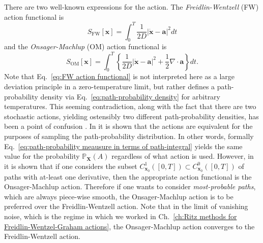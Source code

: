 There are two well-known expressions for the action. The \textit{Freidlin-Wentzell} (FW) action functional is \citep{adibStochasticActionsDiffusive2008, ventselSMALLRANDOMPERTURBATIONS1970, touchetteLargeDeviationApproach2009, grafkeNumericalComputationRare2019}
\begin{equation} \label{eq:FW action functional}
S_\text{FW}[\mathbf{x}] = \int_0^T \frac{1}{2 D} |\dot{\mathbf{x}} - \mathbf{a}|^2 dt
\end{equation}
and the \textit{Onsager-Machlup} (OM) action functional is \citep{adibStochasticActionsDiffusive2008, durrOnsagerMachlupFunctionLagrangian1978a, stratonovichProbabilityFunctionalDiffusion1971, fujitaOnsagerMachlupFunctionDiffusion1982, onsagerFluctuationsIrreversibleProcesses1953, bachFunctionalsPathsDiffusion1977, horsthemkeOnsagerMachlupFunctionOne1975}
\begin{equation} \label{eq:OM action functional}
S_\text{OM}[\mathbf{x}] = \int_0^T \left\{ \frac{1}{2 D} |\dot{\mathbf{x}} - \mathbf{a}|^2 + \frac{1}{2} \nabla \cdot \mathbf{a} \right\} dt.
\end{equation}
Note that Eq.~\ref{eq:FW action functional} is not interpreted here as a large deviation principle in a zero-temperature limit, but rather defines a path-probability density via Eq.~\ref{eq:path-probability density} for arbitrary temperatures. This seeming contradiction, along with the fact that there are two stochastic actions, yielding ostensibly two different path-probability densities, has been a point of confusion \citep{adibStochasticActionsDiffusive2008, gladrowExperimentalMeasurementRelative2021}.  In \citep{adibStochasticActionsDiffusive2008} it is shown that the actions are equivalent for the purposes of sampling the path-probability distribution. In other words, formally Eq.~\ref{eq:path-probability meausure in terms of path-integral} yields the same value for the probability $\mathbb{P}_\mathbf{X}(A)$ regardless of what action is used. However, in \citep{gladrowExperimentalMeasurementRelative2021} it is shown that if one considers the subset $C^1_{\mathbf{x}_0}([0,T]) \subset C^0_{\mathbf{x}_0}([0,T])$ of paths with at-least one derivative, then the appropriate action functional is the Onsager-Machlup action. Therefore if one wants to consider \textit{most-probable paths}, which are always piece-wise smooth, the Onsager-Machlup action is to be preferred over the Freidlin-Wentzell action. Note that in the limit of vanishing noise, which is the regime in which we worked in Ch.~\ref{ch:Ritz methods for Freidlin-Wentzel-Graham actions}, the Onsager-Machlup action converges to the Freidlin-Wentzell action. 
 
